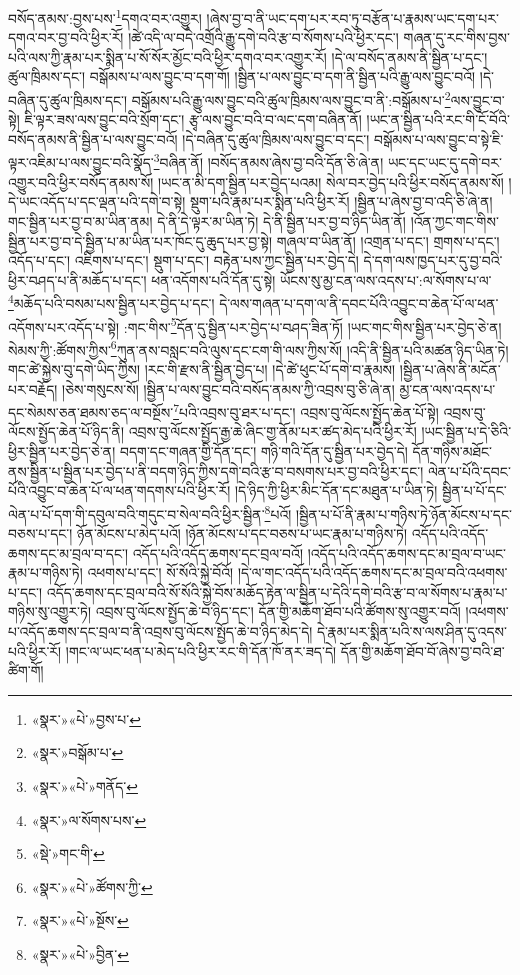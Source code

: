 བསོད་ནམས་:བྱས་པས་\footnote{«སྣར་»«པེ་»བྱས་པ་}དགའ་བར་འགྱུར། །ཞེས་བྱ་བ་ནི་ཡང་དག་པར་རབ་ཏུ་བརྩོན་པ་རྣམས་ཡང་དག་པར་དགའ་བར་བྱ་བའི་ཕྱིར་རོ། །ཚེ་འདི་ལ་བདེ་འགྲོའི་རྒྱུ་དགེ་བའི་རྩ་བ་སོགས་པའི་ཕྱིར་དང་། གཞན་དུ་རང་གིས་བྱས་པའི་ལས་ཀྱི་རྣམ་པར་སྨིན་པ་སོ་སོར་མྱོང་བའི་ཕྱིར་དགའ་བར་འགྱུར་རོ། །དེ་ལ་བསོད་ནམས་ནི་སྦྱིན་པ་དང་། ཚུལ་ཁྲིམས་དང་། བསྒོམས་པ་ལས་བྱུང་བ་དག་གོ། །སྦྱིན་པ་ལས་བྱུང་བ་དག་ནི་སྦྱིན་པའི་རྒྱུ་ལས་བྱུང་བའོ། །དེ་བཞིན་དུ་ཚུལ་ཁྲིམས་དང་། བསྒོམས་པའི་རྒྱུ་ལས་བྱུང་བའི་ཚུལ་ཁྲིམས་ལས་བྱུང་བ་ནི་:བསྒོམས་པ་\footnote{«སྣར་»བསྒོམ་པ་}ལས་བྱུང་བ་སྟེ། ཇི་ལྟར་ཟས་ལས་བྱུང་བའི་སྲོག་དང་། རྩྭ་ལས་བྱུང་བའི་བ་ལང་དག་བཞིན་ནོ། །ཡང་ན་སྦྱིན་པའི་རང་གི་ངོ་བོའི་བསོད་ནམས་ནི་སྦྱིན་པ་ལས་བྱུང་བའོ། །དེ་བཞིན་དུ་ཚུལ་ཁྲིམས་ལས་བྱུང་བ་དང་། བསྒོམས་པ་ལས་བྱུང་བ་སྟེ་ཇི་ལྟར་འཇིམ་པ་ལས་བྱུང་བའི་སྣོད་\footnote{«སྣར་»«པེ་»གནོད་}བཞིན་ནོ། །བསོད་ནམས་ཞེས་བྱ་བའི་དོན་ཅི་ཞེ་ན། ཡང་དང་ཡང་དུ་དགེ་བར་འགྱུར་བའི་ཕྱིར་བསོད་ནམས་སོ། །ཡང་ན་མི་དག་སྦྱིན་པར་བྱེད་པའམ། སེལ་བར་བྱེད་པའི་ཕྱིར་བསོད་ནམས་སོ། །དེ་ཡང་འདོད་པ་དང་ལྡན་པའི་དགེ་བ་སྟེ། སྡུག་པའི་རྣམ་པར་སྨིན་པའི་ཕྱིར་རོ། །སྦྱིན་པ་ཞེས་བྱ་བ་འདི་ཅི་ཞེ་ན། གང་སྦྱིན་པར་བྱ་བ་མ་ཡིན་ནམ། དེ་ནི་དེ་ལྟར་མ་ཡིན་ཏེ། དེ་ནི་སྦྱིན་པར་བྱ་བ་ཉིད་ཡིན་ནོ། །འོན་ཀྱང་གང་གིས་སྦྱིན་པར་བྱ་བ་དེ་སྦྱིན་པ་མ་ཡིན་པར་ཁོང་དུ་ཆུད་པར་བྱ་སྟེ། གཞལ་བ་ཡིན་ནོ། །འགྲན་པ་དང་། གྲགས་པ་དང་། འདོད་པ་དང་། འཇིགས་པ་དང་། སྡུག་པ་དང་། བརྟེན་པས་ཀྱང་སྦྱིན་པར་བྱེད་དེ། དེ་དག་ལས་ཁྱད་པར་དུ་བྱ་བའི་ཕྱིར་བཤད་པ་ནི་མཆོད་པ་དང་། ཕན་འདོགས་པའི་དོན་དུ་སྟེ། ཡོངས་སུ་མྱ་ངན་ལས་འདས་པ་:ལ་སོགས་པ་ལ་\footnote{«སྣར་»ལ་སོགས་པས་}མཆོད་པའི་བསམ་པས་སྦྱིན་པར་བྱེད་པ་དང་། དེ་ལས་གཞན་པ་དག་ལ་ནི་དབང་པོའི་འབྱུང་བ་ཆེན་པོ་ལ་ཕན་འདོགས་པར་འདོད་པ་སྟེ། :གང་གིས་\footnote{«སྡེ་»གང་གི་}དོན་དུ་སྦྱིན་པར་བྱེད་པ་བཤད་ཟིན་ཏོ། །ཡང་གང་གིས་སྦྱིན་པར་བྱེད་ཅེ་ན། སེམས་ཀྱི་:ཚོགས་ཀྱིས་\footnote{«སྣར་»«པེ་»ཚོགས་ཀྱི་}ཀུན་ནས་བསླང་བའི་ལུས་དང་ངག་གི་ལས་ཀྱིས་སོ། །འདི་ནི་སྦྱིན་པའི་མཚན་ཉིད་ཡིན་ཏེ། གང་ཚེ་སྐྱེས་བུ་དགེ་ཡིད་ཀྱིས། །རང་གི་རྫས་ནི་སྦྱིན་བྱེད་པ། །དེ་ཚེ་ཕུང་པོ་དགེ་བ་རྣམས། །སྦྱིན་པ་ཞེས་ནི་མངོན་པར་བརྗོད། །ཅེས་གསུངས་སོ། །སྦྱིན་པ་ལས་བྱུང་བའི་བསོད་ནམས་ཀྱི་འབྲས་བུ་ཅི་ཞེ་ན། མྱ་ངན་ལས་འདས་པ་དང་སེམས་ཅན་ཐམས་ཅད་ལ་བསྔོས་\footnote{«སྣར་»«པེ་»སྔོས་}པའི་འབྲས་བུ་ཐར་པ་དང་། འབྲས་བུ་ལོངས་སྤྱོད་ཆེན་པོ་སྟེ། འབྲས་བུ་ལོངས་སྤྱོད་ཆེན་པོ་ཉིད་ནི། འབྲས་བུ་ལོངས་སྤྱོད་རྒྱ་ཆེ་ཞིང་གྱ་ནོམ་པར་ཚད་མེད་པའི་ཕྱིར་རོ། །ཡང་སྦྱིན་པ་དེ་ཅིའི་ཕྱིར་སྦྱིན་པར་བྱེད་ཅེ་ན། བདག་དང་གཞན་གྱི་དོན་དང་། གཉི་གའི་དོན་དུ་སྦྱིན་པར་བྱེད་དེ། དོན་གཉིས་མཐོང་ནས་སྦྱིན་པ་སྦྱིན་པར་བྱེད་པ་ནི་བདག་ཉིད་ཀྱིས་དགེ་བའི་རྩ་བ་བསགས་པར་བྱ་བའི་ཕྱིར་དང་། ལེན་པ་པོའི་དབང་པོའི་འབྱུང་བ་ཆེན་པོ་ལ་ཕན་གདགས་པའི་ཕྱིར་རོ། །དེ་ཉིད་ཀྱི་ཕྱིར་མིང་དོན་དང་མཐུན་པ་ཡིན་ཏེ། སྦྱིན་པ་པོ་དང་ལེན་པ་པོ་དག་གི་དབུལ་བའི་གདུང་བ་སེལ་བའི་ཕྱིར་སྦྱིན་\footnote{«སྣར་»«པེ་»བྱིན་}པའོ། །སྦྱིན་པ་པོ་ནི་རྣམ་པ་གཉིས་ཏེ་ཉོན་མོངས་པ་དང་བཅས་པ་དང་། ཉོན་མོངས་པ་མེད་པའོ། །ཉོན་མོངས་པ་དང་བཅས་པ་ཡང་རྣམ་པ་གཉིས་ཏེ། འདོད་པའི་འདོད་ཆགས་དང་མ་བྲལ་བ་དང་། འདོད་པའི་འདོད་ཆགས་དང་བྲལ་བའོ། །འདོད་པའི་འདོད་ཆགས་དང་མ་བྲལ་བ་ཡང་རྣམ་པ་གཉིས་ཏེ། འཕགས་པ་དང་། སོ་སོའི་སྐྱེ་བོའོ། །དེ་ལ་གང་འདོད་པའི་འདོད་ཆགས་དང་མ་བྲལ་བའི་འཕགས་པ་དང་། འདོད་ཆགས་དང་བྲལ་བའི་སོ་སོའི་སྐྱེ་བོས་མཆོད་རྟེན་ལ་སྦྱིན་པ་དེའི་དགེ་བའི་རྩ་བ་ལ་སོགས་པ་རྣམ་པ་གཉིས་སུ་འགྱུར་ཏེ། འབྲས་བུ་ལོངས་སྤྱོད་ཆེ་བ་ཉིད་དང་། དོན་གྱི་མཆོག་ཐོབ་པའི་ཚོགས་སུ་འགྱུར་བའོ། །འཕགས་པ་འདོད་ཆགས་དང་བྲལ་བ་ནི་འབྲས་བུ་ལོངས་སྤྱོད་ཆེ་བ་ཉིད་མེད་དེ། དེ་རྣམ་པར་སྨིན་པའི་ས་ལས་ཤིན་དུ་འདས་པའི་ཕྱིར་རོ། །གང་ལ་ཡང་ཕན་པ་མེད་པའི་ཕྱིར་རང་གི་དོན་ཁོ་ནར་ཟད་དེ། དོན་གྱི་མཆོག་ཐོབ་བོ་ཞེས་བྱ་བའི་ཐ་ཚིག་གོ། 
